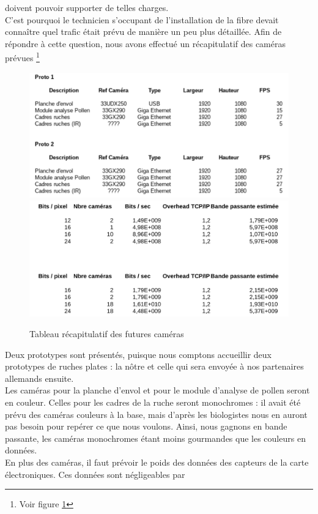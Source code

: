\documentclass[11pt,french,a4paper]{report}
\begin{document}
doivent pouvoir supporter de telles charges. \\
C'est pourquoi le technicien s'occupant de l'installation de la fibre devait connaître quel trafic était prévu de manière un
peu plus détaillée. Afin de répondre à cette question, nous avons effectué un récapitulatif des caméras prévues 
\footnote{Voir figure \ref{tab_recap_cam}}
\begin{figure}[!h]
    \centering
    \includegraphics[scale=0.25]{../images/annexes/camera_bp.png} 
    \includegraphics[scale=0.25]{../images/annexes/camera_bp2.png} 
    \caption{Tableau récapitulatif des futures caméras}
    \label{tab_recap_cam}
\end{figure}
Deux prototypes sont présentés, puisque nous comptons accueillir deux prototypes de ruches plates : la nôtre et 
celle qui sera envoyée à nos partenaires allemands ensuite. \\
Les caméras pour la planche d'envol et pour le module d'analyse de pollen seront en couleur. Celles pour les cadres de la ruche
seront monochromes : il avait été prévu des caméras couleurs à la base, mais d'après les biologistes nous en auront pas besoin pour 
repérer ce que nous voulons. Ainsi, nous gagnons en bande passante, les caméras monochromes étant moins gourmandes que les couleurs 
en données. \\
En plus des caméras, il faut prévoir le poids des données des capteurs de la carte électroniques. Ces données sont négligeables par
\end{document}
